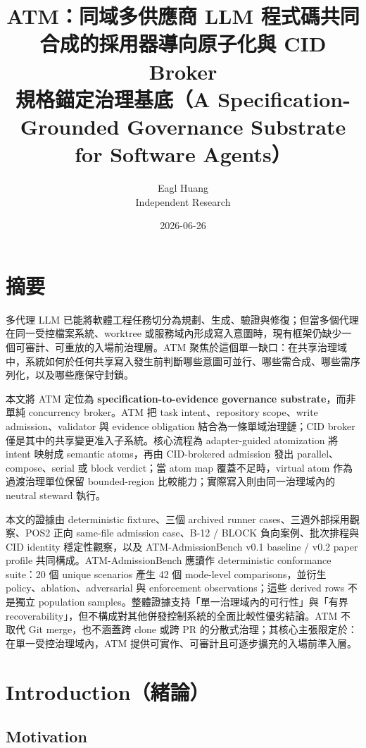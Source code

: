 \documentclass[a4paper,fontset=none]{ctexart}
\title{\textbf{ATM：同域多供應商 LLM 程式碼共同合成的採用器導向原子化與 CID Broker}\\
\large 規格錨定治理基底（A Specification-Grounded Governance Substrate for Software Agents）}
\author{Eagl Huang\\Independent Research}
\date{2026-06-26}
\begin{document}
\maketitle

\section*{摘要}

多代理 LLM 已能將軟體工程任務切分為規劃、生成、驗證與修復；但當多個代理在同一受控檔案系統、worktree 或服務域內形成寫入意圖時，現有框架仍缺少一個可審計、可重放的入場前治理層。ATM 聚焦於這個單一缺口：在共享治理域中，系統如何於任何共享寫入發生前判斷哪些意圖可並行、哪些需合成、哪些需序列化，以及哪些應保守封鎖。

本文將 ATM 定位為 \textbf{specification-to-evidence governance substrate}，而非單純 concurrency broker。ATM 把 task intent、repository scope、write admission、validator 與 evidence obligation 結合為一條單域治理鏈；CID broker 僅是其中的共享變更准入子系統。核心流程為 adapter-guided atomization 將 intent 映射成 semantic atoms，再由 CID-brokered admission 發出 parallel、compose、serial 或 block verdict；當 atom map 覆蓋不足時，virtual atom 作為過渡治理單位保留 bounded-region 比較能力；實際寫入則由同一治理域內的 neutral steward 執行。

本文的證據由 deterministic fixture、三個 archived runner cases、三週外部採用觀察、POS2 正向 same-file admission case、B-12 / BLOCK 負向案例、批次排程與 CID identity 穩定性觀察，以及 ATM-AdmissionBench v0.1 baseline / v0.2 paper profile 共同構成。ATM-AdmissionBench 應讀作 deterministic conformance suite：20 個 unique scenarios 產生 42 個 mode-level comparisons，並衍生 policy、ablation、adversarial 與 enforcement observations；這些 derived rows 不是獨立 population samples。整體證據支持「單一治理域內的可行性」與「有界 recoverability」，但不構成對其他併發控制系統的全面比較性優劣結論。ATM 不取代 Git merge，也不涵蓋跨 clone 或跨 PR 的分散式治理；其核心主張限定於：在單一受控治理域內，ATM 提供可實作、可審計且可逐步擴充的入場前準入層。

\section{Introduction（緒論）}

\subsection{Motivation}
\end{document}
